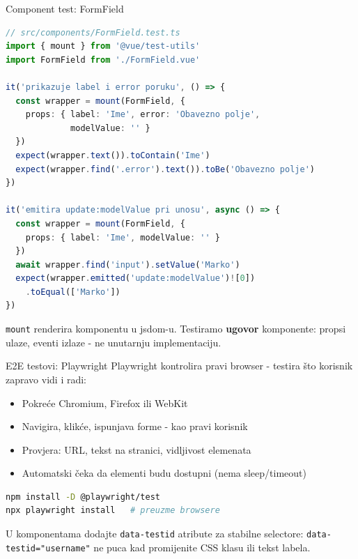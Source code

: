 \begin{frame}[fragile,shrink=5]{Component test: FormField}
\begin{lstlisting}[language=typescript]
// src/components/FormField.test.ts
import { mount } from '@vue/test-utils'
import FormField from './FormField.vue'

it('prikazuje label i error poruku', () => {
  const wrapper = mount(FormField, {
    props: { label: 'Ime', error: 'Obavezno polje',
             modelValue: '' }
  })
  expect(wrapper.text()).toContain('Ime')
  expect(wrapper.find('.error').text()).toBe('Obavezno polje')
})

it('emitira update:modelValue pri unosu', async () => {
  const wrapper = mount(FormField, {
    props: { label: 'Ime', modelValue: '' }
  })
  await wrapper.find('input').setValue('Marko')
  expect(wrapper.emitted('update:modelValue')![0])
    .toEqual(['Marko'])
})
\end{lstlisting}

\vspace{0.4em}
\texttt{mount} renderira komponentu u jsdom-u. Testiramo \textbf{ugovor} komponente: propsi ulaze, eventi izlaze - ne unutarnju implementaciju.
\end{frame}

\begin{frame}[fragile,shrink=5]{E2E testovi: Playwright}
Playwright kontrolira pravi browser - testira što korisnik zapravo vidi i radi:

\vspace{0.4em}
\begin{itemize}
  \item Pokreće Chromium, Firefox ili WebKit
  \item Navigira, klikće, ispunjava forme - kao pravi korisnik
  \item Provjera: URL, tekst na stranici, vidljivost elemenata
  \item Automatski čeka da elementi budu dostupni (nema sleep/timeout)
\end{itemize}

\vspace{0.6em}
\begin{lstlisting}[language=bash]
npm install -D @playwright/test
npx playwright install   # preuzme browsere
\end{lstlisting}

\vspace{0.4em}
U komponentama dodajte \texttt{data-testid} atribute za stabilne selectore: \texttt{data-testid="username"} ne puca kad promijenite CSS klasu ili tekst labela.
\end{frame}


